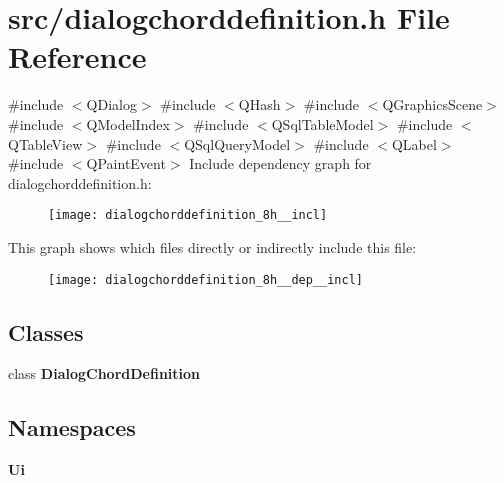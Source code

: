 \section{src/dialogchorddefinition.h File Reference}
\label{dialogchorddefinition_8h}
{\ttfamily \#include $<$Q\+Dialog$>$}\newline
{\ttfamily \#include $<$Q\+Hash$>$}\newline
{\ttfamily \#include $<$Q\+Graphics\+Scene$>$}\newline
{\ttfamily \#include $<$Q\+Model\+Index$>$}\newline
{\ttfamily \#include $<$Q\+Sql\+Table\+Model$>$}\newline
{\ttfamily \#include $<$Q\+Table\+View$>$}\newline
{\ttfamily \#include $<$Q\+Sql\+Query\+Model$>$}\newline
{\ttfamily \#include $<$Q\+Label$>$}\newline
{\ttfamily \#include $<$Q\+Paint\+Event$>$}\newline
Include dependency graph for dialogchorddefinition.\+h\+:\nopagebreak
\begin{figure}[H]
\begin{center}
\leavevmode
\texttt{[image: dialogchorddefinition\_8h\_\_incl]}
\end{center}
\end{figure}
This graph shows which files directly or indirectly include this file\+:\nopagebreak
\begin{figure}[H]
\begin{center}
\leavevmode
\texttt{[image: dialogchorddefinition\_8h\_\_dep\_\_incl]}
\end{center}
\end{figure}
\subsection*{Classes}
\begin{DoxyCompactItemize}
\item 
class \textbf{ Dialog\+Chord\+Definition}
\end{DoxyCompactItemize}
\subsection*{Namespaces}
\begin{DoxyCompactItemize}
\item 
 \textbf{ Ui}
\end{DoxyCompactItemize}
